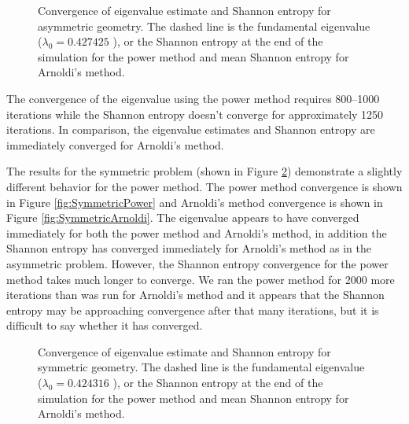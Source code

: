 \documentclass[12]{ansnse}
\begin{document}
\begin{doublespace}
\begin{figure}[h]\centering

    \caption{Convergence of eigenvalue estimate and Shannon entropy for asymmetric geometry.  The dashed line is the fundamental eigenvalue ($\lambda_0 = 0.427425$ \cite{Kornreich:2002Semi--0}), or the Shannon entropy at the end of the simulation for the power method and mean Shannon entropy for Arnoldi's method.}
    \label{fig:Asymmetric}
\end{figure}

The convergence of the eigenvalue using the power method requires 800--1000 iterations while the Shannon entropy doesn't converge for approximately 1250 iterations.  In comparison, the eigenvalue estimates and Shannon entropy are immediately converged for Arnoldi's method.

The results for the symmetric problem (shown in Figure \ref{fig:Symmetric}) demonstrate a slightly different behavior for the power method.  The power method convergence is shown in Figure \ref{fig:SymmetricPower} and Arnoldi's method convergence is shown in Figure \ref{fig:SymmetricArnoldi}.  The eigenvalue appears to have converged immediately for both the power method and Arnoldi's method, in addition the Shannon entropy has converged immediately for Arnoldi's method as in the asymmetric problem.  However, the Shannon entropy convergence for the power method takes much longer to converge.  We ran the power method for 2000 more iterations than was run for Arnoldi's method and it appears that the Shannon entropy may be approaching convergence after that many iterations, but it is difficult to say whether it has converged.  


\begin{figure}[h]\centering

    \caption{Convergence of eigenvalue estimate and Shannon entropy for symmetric geometry.  The dashed line is the fundamental eigenvalue ($\lambda_0 = 0.424316$ \cite{Kornreich:2002Semi--0}), or the Shannon entropy at the end of the simulation for the power method and mean Shannon entropy for Arnoldi's method.}
    \label{fig:Symmetric}
\end{figure}


\end{doublespace}
\end{document}
